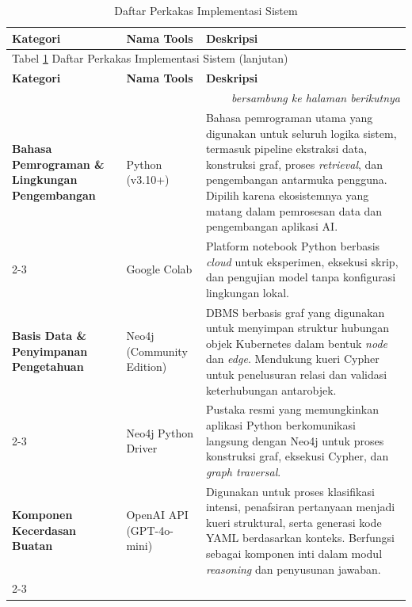 ﻿\begin{longtable}{|p{3cm}|p{4cm}|p{6cm}|}
\caption{Daftar Perkakas Implementasi Sistem}
\label{tbl:tools} \\
\hline
\textbf{Kategori} & \textbf{Nama Tools} & \textbf{Deskripsi} \\ \hline
\endfirsthead

\multicolumn{3}{l}{Tabel \ref{tbl:tools} Daftar Perkakas Implementasi Sistem (lanjutan)} \\
\hline
\textbf{Kategori} & \textbf{Nama Tools} & \textbf{Deskripsi} \\ \hline
\endhead

\hline
\multicolumn{3}{r}{\textit{bersambung ke halaman berikutnya}} \\
\endfoot

\hline
\endlastfoot

\textbf{Bahasa Pemrograman \& Lingkungan Pengembangan} &
Python (v3.10+) &
Bahasa pemrograman utama yang digunakan untuk seluruh logika sistem, termasuk 
pipeline ekstraksi data, konstruksi graf, proses \textit{retrieval}, dan 
pengembangan antarmuka pengguna. Dipilih karena ekosistemnya yang matang dalam 
pemrosesan data dan pengembangan aplikasi AI. \\ \cline{2-3}

& Google Colab &
Platform notebook Python berbasis \textit{cloud} untuk eksperimen, eksekusi skrip,
dan pengujian model tanpa konfigurasi lingkungan lokal. \\ \hline

\textbf{Basis Data \& Penyimpanan Pengetahuan} &
Neo4j (Community Edition) &
DBMS berbasis graf yang digunakan untuk menyimpan struktur hubungan objek 
Kubernetes dalam bentuk \textit{node} dan \textit{edge}. Mendukung kueri Cypher untuk penelusuran 
relasi dan validasi keterhubungan antarobjek. \\ \cline{2-3}

& Neo4j Python Driver &
Pustaka resmi yang memungkinkan aplikasi Python berkomunikasi langsung dengan 
Neo4j untuk proses konstruksi graf, eksekusi Cypher, dan \textit{graph traversal}. \\ \hline

\textbf{Komponen Kecerdasan Buatan} &
OpenAI API (GPT-4o-mini) &
Digunakan untuk proses klasifikasi intensi, penafsiran pertanyaan menjadi kueri 
struktural, serta generasi kode YAML berdasarkan konteks. Berfungsi sebagai 
komponen inti dalam modul \textit{reasoning} dan penyusunan jawaban. \\ \cline{2-3}


\end{longtable}
